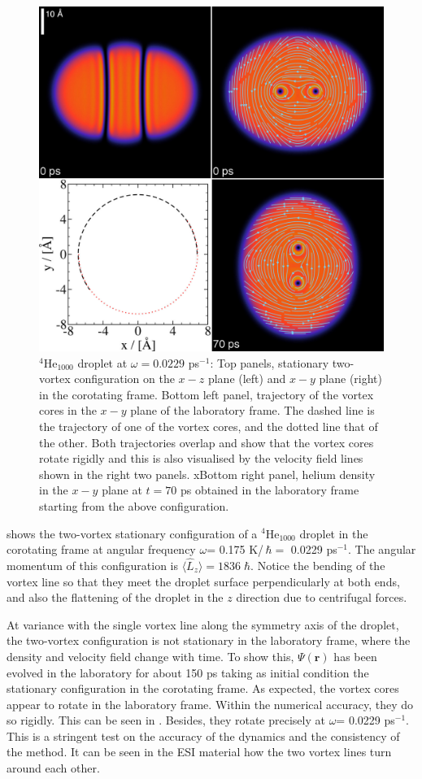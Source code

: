 \begin{figure}[h]
\centerline{\includegraphics[width=0.8\linewidth,clip]{fig7}}
\caption{\label{fig7-capture}
$^4$He$_{1000}$ droplet at $\omega= 0.0229$ ps$^{-1}$: Top panels, stationary 
two-vortex configuration on the $x-z$ plane (left) and  $x-y$ plane (right)  in the corotating frame.
Bottom left panel, trajectory of the vortex cores 
in the $x-y$ plane of the laboratory frame. 
The dashed line is the trajectory of one of the vortex cores, and the dotted line that of the other. Both trajectories  overlap and show that the vortex cores rotate rigidly and this is also visualised by the velocity field lines shown in the right two panels. xBottom right panel, helium density in the $x-y$ plane at $t=70$ ps obtained in the laboratory frame starting from the above configuration\citep{Coppens2017-2}. 
}
\end{figure}

 shows the two-vortex  
stationary configuration of a $^4$He$_{1000}$ droplet  in the corotating frame 
at angular frequency $\omega$= 0.175 K/\,$\hbar=$ 0.0229 ps$^{-1}$. 
The angular momentum  of this configuration is  $\langle \hat{L}_z \rangle = 1836 \; \hbar$. 
Notice the bending 
of the vortex line so that they meet  
the droplet surface perpendicularly at both ends, and also the 
flattening of the droplet in the $z$ direction
due to centrifugal forces.

At variance with the single vortex line along the symmetry 
axis of the droplet, the two-vortex  configuration is not stationary in the laboratory frame, 
where the density and velocity field change with time. 
To show this, $\Psi(\mathbf{r})$ has been evolved 
in the laboratory  for about 150 ps
taking as initial condition the stationary 
configuration in the corotating frame. 
As expected, the vortex cores appear to rotate in the laboratory frame. 
Within the numerical accuracy, they do so rigidly. This can be seen in 
. Besides, they rotate precisely at 
$\omega$= 0.0229 ps$^{-1}$. This is a  stringent test 
on the accuracy of the dynamics and the consistency of the method.
It can be seen in the ESI 
material how  the two vortex lines turn around each other.

